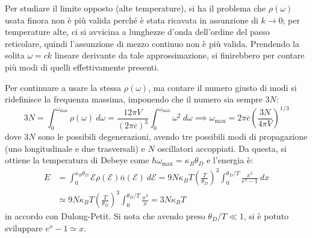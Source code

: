 \documentclass[10pt, a4paper]{scrartcl}
\numberwithin{equation}{subsection}
\theoremstyle{style1}
\begin{document}
Per studiare il limite opposto (alte temperature), si ha il problema che $\rho (\omega)$ usata finora non \`e pi\`u valida perch\'e \`e stata ricavata in assunzione di $k\to 0$; 
per temperature alte, ci si avvicina a lunghezze d'onda dell'ordine del passo reticolare, quindi l'assunzione di mezzo continuo non \`e pi\`u valida.
Prendendo la solita $\omega=ck$ lineare derivante da tale approssimazione, si finirebbero per contare pi\`u modi di quelli effettivamente presenti.

Per continuare a usare la stessa $\rho (\omega)$, ma contare il numero giusto di modi si ridefinisce la frequenza massima, imponendo che il numero sia sempre $3N$:
\begin{equation}
	3N = \int_{0} ^{\omega_\text{max}}  \rho (\omega) \ d\omega= \frac{12 \pi V}{(2\pi \overline{c})^3}\int_{0} ^{\omega_\text{max}} \omega^2 \ d\omega  \implies \omega_\text{max}=2\pi \overline{c} \left(\frac{3N}{4\pi V}\right) ^{ 1/3} 
\end{equation}
dove $3N$ sono le possibili degenerazioni, avendo tre possibili modi di propagazione (uno longitudinale e due trasversali) e $N$ oscillatori accoppiati. Da questa, si ottiene la temperatura di Debeye come $\hbar \omega_\text{max} = \kappa _B \theta _D$ e l'energia \`e:
\begin{equation}
	\begin{split}
		E &= \int_{0} ^{\kappa _B \theta _D} \mathscr{E} \rho (\mathscr{E}) \overline{n}(\mathscr{E}) \ d\mathscr{E} = 9 N\kappa _B T \left(\frac{T}{\theta _D}\right) ^3 \int_{0} ^{\theta _D / T} \frac{x^3}{e^x - 1} \ dx \\
		  &\simeq 9 N\kappa _B T \left(\frac{T}{\theta _D}\right) ^3 \int_{0} ^{\theta _D / T} \frac{x^3}{x}=3N\kappa _B T
	\end{split}
\end{equation}
in accordo con Dulong-Petit. Si nota che avendo preso $\theta _D / T \ll 1$, si \`e potuto sviluppare $e^x -1 \simeq x$.
\end{document}
